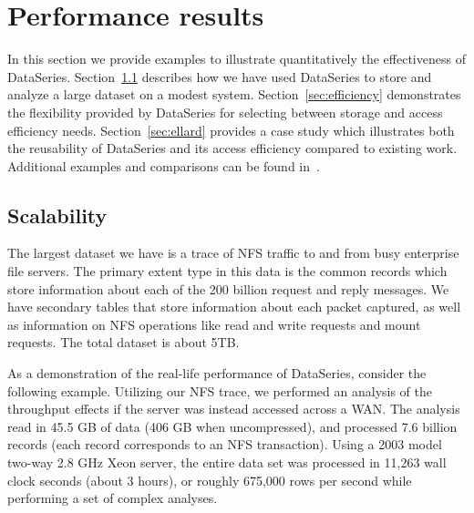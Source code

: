 \documentclass{acm_proc_article-sp}
\newcommand{\fix}[1]{{\LARGE\ensuremath{\bullet}}\textbf{#1}}
\begin{document}
\section{Performance results}\label{sec:results}


In this section we provide examples to illustrate quantitatively the 
effectiveness of DataSeries.  
Section~\ref{sec:scale} describes how we have used DataSeries to store 
and analyze a large dataset on a modest system.
Section~\ref{sec:efficiency} demonstrates the flexibility provided
by DataSeries for selecting between storage and access efficiency needs.
Section~\ref{sec:ellard} provides a case study which illustrates
both the reusability of DataSeries and its access efficiency compared
to existing work.
Additional examples and comparisons can be found 
in~\cite{DSTechnicalReportSnapshot}.

\subsection{Scalability}\label{sec:scale}

The largest dataset we have is a trace of NFS traffic to and from
busy enterprise file servers.
The primary extent type 
in this data is the common records which store information about each
of the 200 billion request and reply messages. We have secondary tables that
store information about each packet captured, as well as 
information on NFS operations 
like read and write requests and mount requests.  
The total dataset
is about 5TB.

As a demonstration of the real-life performance of
DataSeries, consider the following example.  Utilizing our NFS
trace, we performed an analysis of the throughput
effects if the server was instead accessed across a WAN.
The analysis read in 45.5 GB of data (406 GB when uncompressed), and
processed 7.6 billion records (each record corresponds to an NFS
transaction).  Using a 2003 model two-way 2.8 GHz Xeon server, the
entire data set was processed in 11,263 wall clock seconds (about 3
hours), or roughly 675,000 rows per second while performing a set of complex
analyses. 
\end{document}
